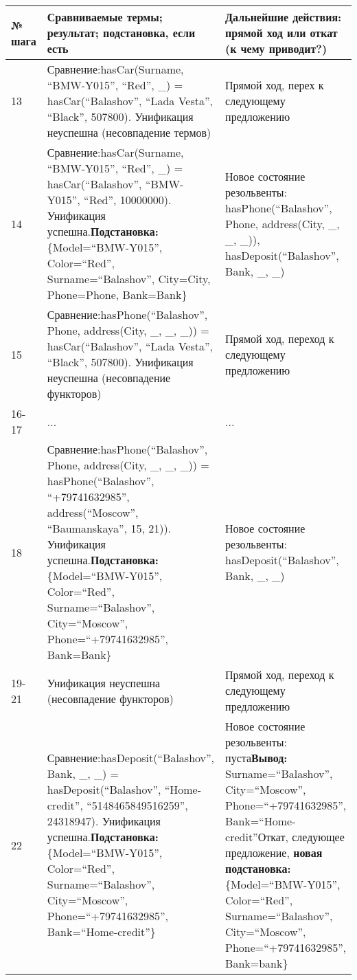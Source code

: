 \documentclass[14pt,a4paper]{scrreprt}
\begin{document}
\begin{enumerate}
\begin{table}[H]
	\centering
	\begin{tabular}{|p{1.2cm\small}|p{9cm\small}|p{5cm\small}|}
		\hline
		№ шага & Сравниваемые термы; результат; подстановка, если есть & Дальнейшие действия: прямой ход или откат (к чему приводит?)\\
		\hline
		13 & Сравнение:\linebreak hasCar(Surname, ``BMW-Y015'', ``Red'', \_) = hasCar(``Balashov'', ``Lada Vesta'', ``Black'', 507800). Унификация неуспешна (несовпадение термов) & Прямой ход, перех к следующему предложению\\
		\hline
		14 & Сравнение:\linebreak hasCar(Surname, ``BMW-Y015'', ``Red'', \_) = hasCar(``Balashov'', ``BMW-Y015'', ``Red'', 10000000). Унификация успешна.\linebreak \textbf{Подстановка:} \{Model=``BMW-Y015'', Color=``Red'', Surname=``Balashov'', City=City, Phone=Phone, Bank=Bank\} & Новое состояние резольвенты: hasPhone(``Balashov'', Phone, address(City, \_, \_, \_)), hasDeposit(``Balashov'', Bank, \_, \_)\\
		\hline
		15 & Сравнение:\linebreak hasPhone(``Balashov'', Phone, address(City, \_, \_, \_)) = hasCar(``Balashov'', ``Lada Vesta'', ``Black'', 507800). Унификация неуспешна (несовпадение функторов) & Прямой ход, переход к следующему предложению\\
		\hline
		16-17 & ... & ...\\
		\hline
		18 & Сравнение:\linebreak hasPhone(``Balashov'', Phone, address(City, \_, \_, \_)) = hasPhone(``Balashov'', ``+79741632985'', address(``Moscow'', ``Baumanskaya'', 15, 21)). Унификация успешна.\linebreak \textbf{Подстановка:} \{Model=``BMW-Y015'', Color=``Red'', Surname=``Balashov'', City=``Moscow'', Phone=``+79741632985'', Bank=Bank\} & Новое состояние резольвенты: hasDeposit(``Balashov'', Bank, \_, \_)\\
		\hline
		19-21 & Унификация неуспешна (несовпадение функторов) & Прямой ход, переход к следующему предложению\\
		\hline
		22 & Сравнение:\linebreak hasDeposit(``Balashov'', Bank, \_, \_) = hasDeposit(``Balashov'', ``Home-credit'', ``5148465849516259'', 24318947). Унификация успешна.\linebreak \textbf{Подстановка:} \{Model=``BMW-Y015'', Color=``Red'', Surname=``Balashov'', City=``Moscow'', Phone=``+79741632985'', Bank=``Home-credit''\} & Новое состояние резольвенты: пуста\linebreak \textbf{Вывод:} Surname=``Balashov'', City=``Moscow'', Phone=``+79741632985'', Bank=``Home-credit''\linebreak Откат, следующее предложение, \textbf{новая подстановка:} \{Model=``BMW-Y015'', Color=``Red'', Surname=``Balashov'', City=``Moscow'', Phone=``+79741632985'', Bank=bank\}\\
		\hline
	\end{tabular}
\end{table}


\end{enumerate}
\end{document}
